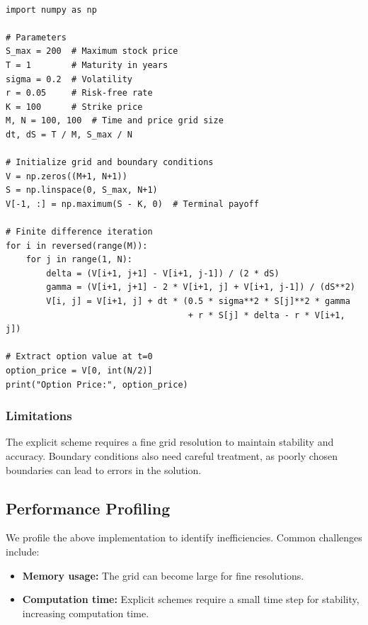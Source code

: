 \documentclass[12pt,a4paper]{report}
\begin{document}
\begin{tcolorbox}[colframe=blue!50!black, colback=blue!5, title=Explicit Finite Difference Scheme]

\begin{verbatim}

import numpy as np

# Parameters
S_max = 200  # Maximum stock price
T = 1        # Maturity in years
sigma = 0.2  # Volatility
r = 0.05     # Risk-free rate
K = 100      # Strike price
M, N = 100, 100  # Time and price grid size
dt, dS = T / M, S_max / N

# Initialize grid and boundary conditions
V = np.zeros((M+1, N+1))
S = np.linspace(0, S_max, N+1)
V[-1, :] = np.maximum(S - K, 0)  # Terminal payoff

# Finite difference iteration
for i in reversed(range(M)):
    for j in range(1, N):
        delta = (V[i+1, j+1] - V[i+1, j-1]) / (2 * dS)
        gamma = (V[i+1, j+1] - 2 * V[i+1, j] + V[i+1, j-1]) / (dS**2)
        V[i, j] = V[i+1, j] + dt * (0.5 * sigma**2 * S[j]**2 * gamma 
                                    + r * S[j] * delta - r * V[i+1, j])

# Extract option value at t=0
option_price = V[0, int(N/2)]
print("Option Price:", option_price)
\end{verbatim}
\end{tcolorbox}

\subsubsection{Limitations}
The explicit scheme requires a fine grid resolution to maintain stability and accuracy. Boundary conditions also need careful treatment, as poorly chosen boundaries can lead to errors in the solution.

\subsection{Performance Profiling}
We profile the above implementation to identify inefficiencies. Common challenges include:
\begin{itemize}
    \item \textbf{Memory usage:} The grid can become large for fine resolutions.
    \item \textbf{Computation time:} Explicit schemes require a small time step for stability, increasing computation time.
\end{itemize}
\end{document}
